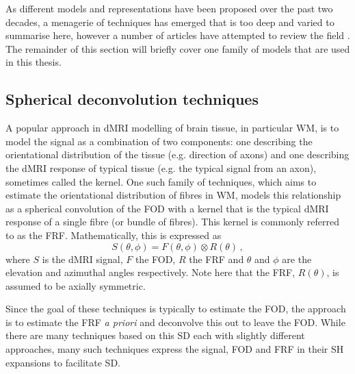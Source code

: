 As different models and representations have been proposed over the past two decades, a menagerie of techniques has emerged that is too deep and varied to summarise here, however a number of articles have attempted to review the field \cite{Alexander2017,Novikov2019,Jelescu2017}.
The remainder of this section will briefly cover one family of models that are used in this thesis.

\subsection{Spherical deconvolution techniques}
\label{sec:bg_spherical_deconv}
A popular approach in \ac{dMRI} modelling of brain tissue, in particular \ac{WM}, is to model the signal as a combination of two components: one describing the orientational distribution of the tissue (e.g. direction of axons) and one describing the \ac{dMRI} response of typical tissue (e.g. the typical signal from an axon), sometimes called the kernel.
One such family of techniques, which aims to estimate the orientational distribution of fibres in \ac{WM}, models this relationship as a spherical convolution of the \ac{FOD} with a kernel that is the typical \ac{dMRI} response of a single fibre (or bundle of fibres). This kernel is commonly referred to as the \ac{FRF}.
Mathematically, this is expressed as
\begin{equation}
  S(\theta,\phi) = F(\theta, \phi) \otimes R(\theta) \,,
  \label{eq:bg_sd}
\end{equation}
where $S$ is the \ac{dMRI} signal, $F$ the \ac{FOD}, $R$ the \ac{FRF} and $\theta$ and $\phi$ are the elevation and azimuthal angles respectively. Note here that the \ac{FRF}, $R(\theta)$, is assumed to be axially symmetric. 

Since the goal of these techniques is typically to estimate the \ac{FOD}, the approach is to estimate the \ac{FRF} \emph{a priori} and deconvolve this out to leave the \ac{FOD}.
While there are many techniques based on this \ac{SD} each with slightly different approaches, many such techniques express the signal, \ac{FOD} and \ac{FRF} in their \ac{SH} expansions to facilitate \ac{SD}.


